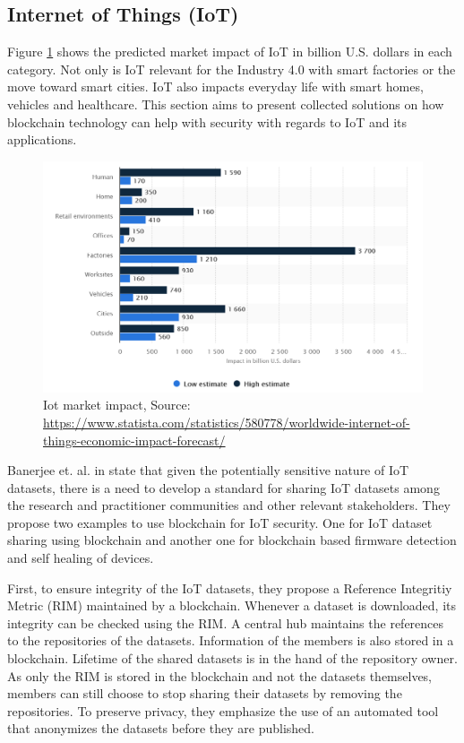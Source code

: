 \subsection{Internet of Things (IoT)}
\label{subsec:03_IoT}

Figure \ref{fig:iot_market} shows the predicted market impact of IoT in billion U.S. dollars in each category.
Not only is IoT relevant for the Industry 4.0 with smart factories or the move toward smart cities. IoT also
impacts everyday life with smart homes, vehicles and healthcare. This section aims to present collected solutions on how  blockchain technology can help with security with regards to IoT and its applications.


\begin{figure}[ht!]
  \begin{center}
    \includegraphics[scale=0.6]{Talk7/img/iot/iot_statista}
  \end{center}
  \caption{Iot market impact, Source: \protect\url{https://www.statista.com/statistics/580778/worldwide-internet-of-things-economic-impact-forecast/}~\cite{StatistaIoT} }
  \label{fig:iot_market}
\end{figure}

Banerjee et. al. in \cite{Banerjee2018} state that given the potentially sensitive nature of IoT datasets,
there is a need to develop a standard for sharing IoT datasets among the research and practitioner communities
and other relevant stakeholders. They propose two examples to use blockchain for IoT security. One for IoT dataset sharing using blockchain and another one for
blockchain based firmware detection and self healing of devices.

First, to ensure integrity of the IoT datasets, they propose a Reference Integritiy Metric (RIM) maintained by a blockchain. Whenever a dataset is downloaded, its integrity can be checked using the RIM.
A central hub maintains the references to the repositories of the datasets. Information of the members is also stored in a blockchain.
Lifetime of the shared datasets is in the hand of the repository owner.
As only the RIM is stored in the blockchain and not the datasets themselves, members can still choose to stop sharing their datasets by removing the repositories.
To preserve privacy, they emphasize the use of an automated tool that anonymizes the datasets before they are published.



